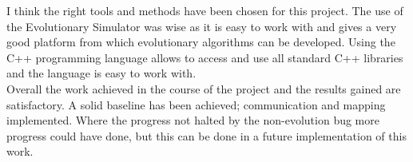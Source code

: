 I think the right tools and methods have been chosen for this project.
The use of the Evolutionary Simulator was wise as it is easy to work with and gives a very good platform from which evolutionary algorithms can be developed. 
Using the C++ programming language allows to access and use all standard C++ libraries and the language is easy to work with.\\

Overall the work achieved in the course of the project and the results gained are satisfactory. A solid baseline has been achieved; communication and mapping implemented. Where the progress not halted by the non-evolution bug more progress could have done, but this can be done in a future implementation of this work.\\


